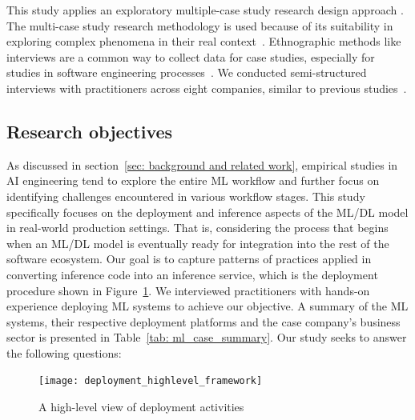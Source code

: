 

This study applies an exploratory multiple-case study research design approach \cite{runeson2009guidelines}. The multi-case study research methodology is used because of its suitability in exploring complex phenomena in their real context~\cite{easterbrook2008selecting, runeson2009guidelines}. Ethnographic methods like interviews are a common way to collect data for case studies, especially for studies in software engineering processes~\cite{giray2021software}. We conducted semi-structured interviews with practitioners across eight companies, similar to previous studies~\cite{shankar2022operationalizing, baier2019challenges, lwakatare2019taxonomy}.

\subsection{Research objectives}
As discussed in section~\ref{sec: background and related work}, empirical studies in AI engineering \cite{bosch2021engineering} tend to explore the entire ML workflow and further focus on identifying challenges encountered in various workflow stages. This study specifically focuses on the deployment and inference aspects of the ML/DL model in real-world production settings. That is, considering the process that begins when an ML/DL model is eventually ready for integration into the rest of the software ecosystem. Our goal is to capture patterns of practices applied in converting inference code into an inference service, which is the deployment procedure shown in Figure~\ref{fig:deployment_highlevel_framework}. We interviewed practitioners with hands-on experience deploying ML systems to achieve our objective. A summary of the ML systems, their respective deployment platforms and the case company's business sector is presented in Table~\ref{tab: ml_case_summary}. Our study seeks to answer the following questions:

\begin{figure}[h]
\centering
\texttt{[image: deployment\_highlevel\_framework]}
\caption{A high-level view of deployment activities}
\label{fig:deployment_highlevel_framework}
\end{figure}

